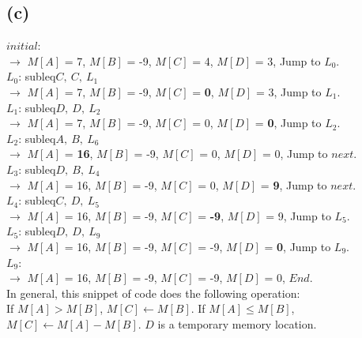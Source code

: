 \documentclass[a4paper, 11pt]{article}
\begin{document}
\subsection*{(c)}
$initial$:\\
$\rightarrow$ $M[A]$ = 7, $M[B]$ = -9, $M[C]$ = 4, $M[D]$ = 3, Jump to $L_0$.\\[7pt]
\indent $L_0$: subleq\quad $C,\ C,\ L_1$\\
$\rightarrow$ $M[A]$ = 7, $M[B]$ = -9, $M[C]$ = \textbf{0}, $M[D]$ = 3, Jump to $L_1$.\\[7pt]
\indent $L_1$: subleq\quad $D,\ D,\ L_2$\\
$\rightarrow$ $M[A]$ = 7, $M[B]$ = -9, $M[C]$ = 0, $M[D]$ = \textbf{0}, Jump to $L_2$.\\[7pt]
\indent $L_2$: subleq\quad $A,\ B,\ L_6$\\
$\rightarrow$ $M[A]$ = \textbf{16}, $M[B]$ = -9, $M[C]$ = 0, $M[D]$ = 0, Jump to $next$.\\[7pt]
\indent $L_3$: subleq\quad $D,\ B,\ L_4$\\
$\rightarrow$ $M[A]$ = 16, $M[B]$ = -9, $M[C]$ = 0, $M[D]$ = \textbf{9}, Jump to $next$.\\[7pt]
\indent $L_4$: subleq\quad $C,\ D,\ L_5$\\
$\rightarrow$ $M[A]$ = 16, $M[B]$ = -9, $M[C]$ = \textbf{-9}, $M[D]$ = 9, Jump to $L_5$.\\[7pt]
\indent $L_5$: subleq\quad $D,\ D,\ L_9$\\
$\rightarrow$ $M[A]$ = 16, $M[B]$ = -9, $M[C]$ = -9, $M[D]$ = \textbf{0}, Jump to $L_9$.\\[7pt]
\indent $L_9$: \\
$\rightarrow$ $M[A]$ = 16, $M[B]$ = -9, $M[C]$ = -9, $M[D]$ = 0, 	$End$.\\

\noindent In general, this snippet of code does the following operation:\\If $M[A] > M[B]$, $M[C] \leftarrow M[B]$. If $M[A] \le M[B]$, $M[C] \leftarrow M[A] - M[B]$. $D$ is a temporary memory location.

\end{document}

